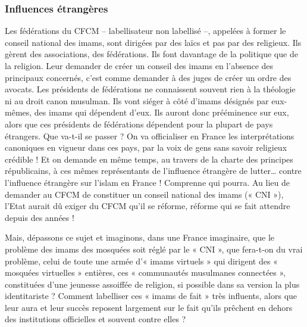 \subsubsection*{Influences étrangères}
Les fédérations du CFCM – labellisateur non labellisé –, appelées à former le conseil national des imams, sont dirigées par des laïcs et pas par des religieux. Ils gèrent des associations, des fédérations. Ils font davantage de la politique que de la religion. Leur demander de créer un conseil des imams en l’absence des principaux concernés, c’est comme demander à des juges de créer un ordre des avocats. Les présidents de fédérations ne connaissent souvent rien à la théologie ni au droit canon musulman. Ils vont siéger à côté d’imams désignés par eux-mêmes, des imams qui dépendent d’eux. Ils auront donc prééminence sur eux, alors que ces présidents de fédérations dépendent pour la plupart de pays étrangers. Que va-t-il se passer ? On va officialiser en France les interprétations canoniques en vigueur dans ces pays, par la voix de gens sans savoir religieux crédible ! Et on demande en même temps, au travers de la charte des principes républicains, à ces mêmes représentants de l’influence étrangère de lutter… contre l’influence étrangère sur l’islam en France ! Comprenne qui pourra. Au lieu de demander au CFCM de constituer un conseil national des imams (« CNI »), l’Etat aurait dû exiger du CFCM qu’il se réforme, réforme qui se fait attendre depuis des années !

Mais, dépassons ce sujet et imaginons, dans une France imaginaire, que le problème des imams des mosquées soit réglé par le « CNI », que fera-t-on du vrai problème, celui de toute une armée d’« imams virtuels » qui dirigent des « mosquées virtuelles » entières, ces « communautés musulmanes connectées », constituées d’une jeunesse assoiffée de religion, si possible dans sa version la plus identitariste ? Comment labelliser ces « imams de fait » très influents, alors que leur aura et leur succès reposent largement sur le fait qu’ils prêchent en dehors des institutions officielles et souvent contre elles ?
